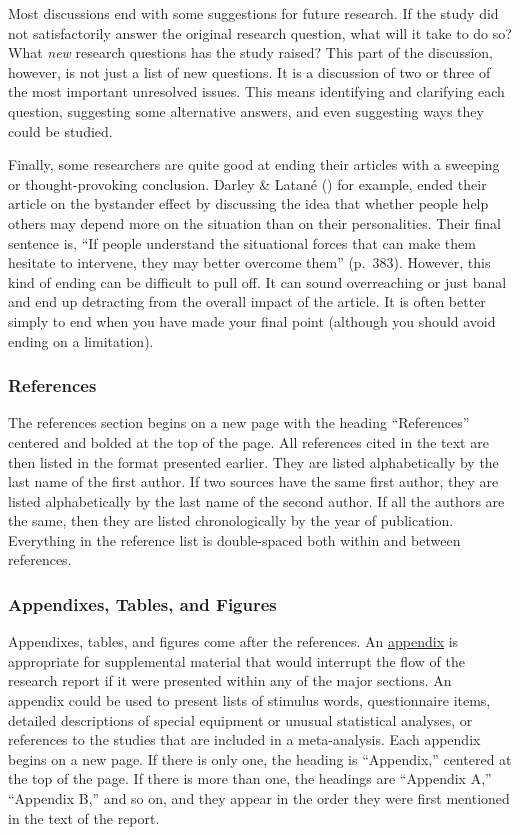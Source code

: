 \documentclass[
]{krantz}
\begin{document}
Most discussions end with some suggestions for future research. If the study did not satisfactorily answer the original research question, what will it take to do so? What \emph{new} research questions has the study raised? This part of the discussion, however, is not just a list of new questions. It is a discussion of two or three of the most important unresolved issues. This means identifying and clarifying each question, suggesting some alternative answers, and even suggesting ways they could be studied.

Finally, some researchers are quite good at ending their articles with a sweeping or thought-provoking conclusion. Darley \& Latané () for example, ended their article on the bystander effect by discussing the idea that whether people help others may depend more on the situation than on their personalities. Their final sentence is, ``If people understand the situational forces that can make them hesitate to intervene, they may better overcome them'' (p.~383). However, this kind of ending can be difficult to pull off. It can sound overreaching or just banal and end up detracting from the overall impact of the article. It is often better simply to end when you have made your final point (although you should avoid ending on a limitation).

\subsubsection*{References}\label{references-1}


The references section begins on a new page with the heading ``References'' centered and bolded at the top of the page. All references cited in the text are then listed in the format presented earlier. They are listed alphabetically by the last name of the first author. If two sources have the same first author, they are listed alphabetically by the last name of the second author. If all the authors are the same, then they are listed chronologically by the year of publication. Everything in the reference list is double-spaced both within and between references.

\subsubsection*{Appendixes, Tables, and Figures}\label{appendixes-tables-and-figures}


Appendixes, tables, and figures come after the references. An \hyperref[appendix]{appendix} is appropriate for supplemental material that would interrupt the flow of the research report if it were presented within any of the major sections. An appendix could be used to present lists of stimulus words, questionnaire items, detailed descriptions of special equipment or unusual statistical analyses, or references to the studies that are included in a meta-analysis. Each appendix begins on a new page. If there is only one, the heading is ``Appendix,'' centered at the top of the page. If there is more than one, the headings are ``Appendix A,'' ``Appendix B,'' and so on, and they appear in the order they were first mentioned in the text of the report.
\end{document}
